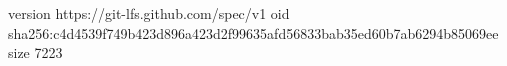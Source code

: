 version https://git-lfs.github.com/spec/v1
oid sha256:c4d4539f749b423d896a423d2f99635afd56833bab35ed60b7ab6294b85069ee
size 7223
